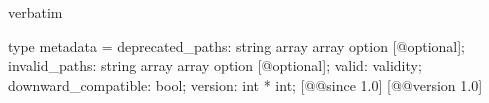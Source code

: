 \begin{camlexample}{verbatim}
\begin{caml}
\begin{camlinput}
type metadata = {
  deprecated_paths: string array array option [@optional];
  invalid_paths: string array array option [@optional];
  valid: validity;
  downward_compatible: bool;
  version: int * int;
} [@@since 1.0]
[@@version 1.0]
\end{camlinput}
\end{caml}
\end{camlexample}
